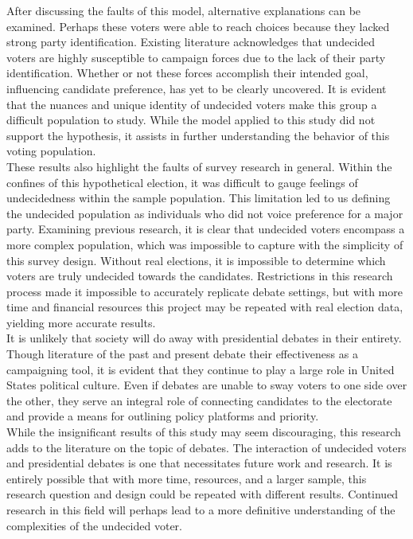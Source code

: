 \documentclass[12pt]{article}
\begin{document}
{{{{After discussing the faults of this model, alternative explanations can be examined. Perhaps these voters were able to reach choices because they lacked strong party identification. Existing literature acknowledges that undecided voters are highly susceptible to campaign forces due to the lack of their party identification. Whether or not these forces accomplish their intended goal, influencing candidate preference, has yet to be clearly uncovered. It is evident that the nuances and unique identity of undecided voters make this group a difficult population to study. While the model applied to this study did not support the hypothesis, it assists in further understanding the behavior of this voting population. \\

These results also highlight the faults of survey research in general. Within the confines of this hypothetical election, it was difficult to gauge feelings of undecidedness within the sample population. This limitation led to us defining the undecided population as individuals who did not voice preference for a major party. Examining previous research, it is clear that undecided voters encompass a more complex population, which was impossible to capture with the simplicity of this survey design. Without real elections, it is impossible to determine which voters are truly undecided towards the candidates. Restrictions in this research process made it impossible to accurately replicate debate settings, but with more time and financial resources this project may be repeated with real election data, yielding more accurate results. \\

It is unlikely that society will do away with presidential debates in their entirety. Though literature of the past and present debate their effectiveness as a campaigning tool, it is evident that they continue to play a large role in United States political culture. Even if debates are unable to sway voters to one side over the other, they serve an integral role of connecting candidates to the electorate and provide a means for outlining policy platforms and priority.\\

While the insignificant results of this study may seem discouraging, this research adds to the literature on the topic of debates. The interaction of undecided voters and presidential debates is one that necessitates future work and research. It is entirely possible that with more time, resources, and a larger sample, this research question and design could be repeated with different results. Continued research in this field will perhaps lead to a more definitive understanding of the complexities of the undecided voter. \\



}}}}
\end{document}
